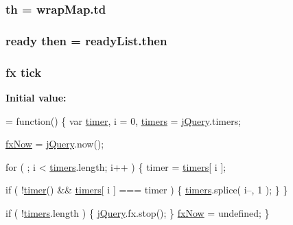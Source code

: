 \subsubsection[{\texorpdfstring{th}{th}}]{ th = wrap\+Map.\+td}\hypertarget{jquery-3_82_81_8js_a2bc51c85bb51dfec37c757866128bced}{}\label{jquery-3_82_81_8js_a2bc51c85bb51dfec37c757866128bced}
\subsubsection[{\texorpdfstring{then}{then}}]{ {\bf ready} then = ready\+List.\+then}\hypertarget{jquery-3_82_81_8js_afa09a8b242de64df6b1163c06651f07f}{}\label{jquery-3_82_81_8js_afa09a8b242de64df6b1163c06651f07f}
\subsubsection[{\texorpdfstring{tick}{tick}}]{ {\bf fx} tick}\hypertarget{jquery-3_82_81_8js_a4820e1fd61053b39dd3bbd8cac9f48ba}{}\label{jquery-3_82_81_8js_a4820e1fd61053b39dd3bbd8cac9f48ba}
{\bfseries Initial value\+:}
\begin{DoxyCode}
= \textcolor{keyword}{function}() \{
    var \hyperlink{jquery-3_82_81_8js_a2b44b4db680ed005831a801cef9f8bb3}{timer},
        i = 0,
        \hyperlink{jquery-3_82_81_8js_a90bf6571856437dc2269be68a12c1d5a}{timers} = \hyperlink{jquery-3_82_81_8js_a609525712f1102566c2b03866ceb2bba}{jQuery}.timers;

    \hyperlink{jquery-3_82_81_8js_a008b3271e2f410e89917bc6d96096296}{fxNow} = \hyperlink{jquery-3_82_81_8js_a609525712f1102566c2b03866ceb2bba}{jQuery}.now();

    \textcolor{keywordflow}{for} ( ; i < \hyperlink{jquery-3_82_81_8js_a90bf6571856437dc2269be68a12c1d5a}{timers}.length; i++ ) \{
        timer = \hyperlink{jquery-3_82_81_8js_a90bf6571856437dc2269be68a12c1d5a}{timers}[ i ];

        
        \textcolor{keywordflow}{if} ( !\hyperlink{jquery-3_82_81_8js_a2b44b4db680ed005831a801cef9f8bb3}{timer}() && \hyperlink{jquery-3_82_81_8js_a90bf6571856437dc2269be68a12c1d5a}{timers}[ i ] === timer ) \{
            \hyperlink{jquery-3_82_81_8js_a90bf6571856437dc2269be68a12c1d5a}{timers}.splice( i--, 1 );
        \}
    \}

    \textcolor{keywordflow}{if} ( !\hyperlink{jquery-3_82_81_8js_a90bf6571856437dc2269be68a12c1d5a}{timers}.length ) \{
        \hyperlink{jquery-3_82_81_8js_a609525712f1102566c2b03866ceb2bba}{jQuery}.fx.stop();
    \}
    \hyperlink{jquery-3_82_81_8js_a008b3271e2f410e89917bc6d96096296}{fxNow} = undefined;
\}
\end{DoxyCode}
